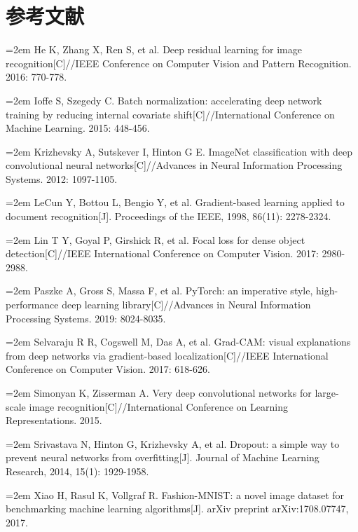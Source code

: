 \documentclass[12pt,a4paper,fontset=fandol]{ctexart}
\numberwithin{figure}{section}
\numberwithin{table}{section}
\numberwithin{equation}{section}
\begin{document}
\section*{参考文献}
{\setlength{\parindent}{0pt}
\newcommand{\refentry}[1]{\par\hangindent=2em #1\vspace{3pt}}
\refentry{He K, Zhang X, Ren S, et al. Deep residual learning for image recognition[C]//IEEE Conference on Computer Vision and Pattern Recognition. 2016: 770-778.}
\refentry{Ioffe S, Szegedy C. Batch normalization: accelerating deep network training by reducing internal covariate shift[C]//International Conference on Machine Learning. 2015: 448-456.}
\refentry{Krizhevsky A, Sutskever I, Hinton G E. ImageNet classification with deep convolutional neural networks[C]//Advances in Neural Information Processing Systems. 2012: 1097-1105.}
\refentry{LeCun Y, Bottou L, Bengio Y, et al. Gradient-based learning applied to document recognition[J]. Proceedings of the IEEE, 1998, 86(11): 2278-2324.}
\refentry{Lin T Y, Goyal P, Girshick R, et al. Focal loss for dense object detection[C]//IEEE International Conference on Computer Vision. 2017: 2980-2988.}
\refentry{Paszke A, Gross S, Massa F, et al. PyTorch: an imperative style, high-performance deep learning library[C]//Advances in Neural Information Processing Systems. 2019: 8024-8035.}
\refentry{Selvaraju R R, Cogswell M, Das A, et al. Grad-CAM: visual explanations from deep networks via gradient-based localization[C]//IEEE International Conference on Computer Vision. 2017: 618-626.}
\refentry{Simonyan K, Zisserman A. Very deep convolutional networks for large-scale image recognition[C]//International Conference on Learning Representations. 2015.}
\refentry{Srivastava N, Hinton G, Krizhevsky A, et al. Dropout: a simple way to prevent neural networks from overfitting[J]. Journal of Machine Learning Research, 2014, 15(1): 1929-1958.}
\refentry{Xiao H, Rasul K, Vollgraf R. Fashion-MNIST: a novel image dataset for benchmarking machine learning algorithms[J]. arXiv preprint arXiv:1708.07747, 2017.}
}
\end{document}
